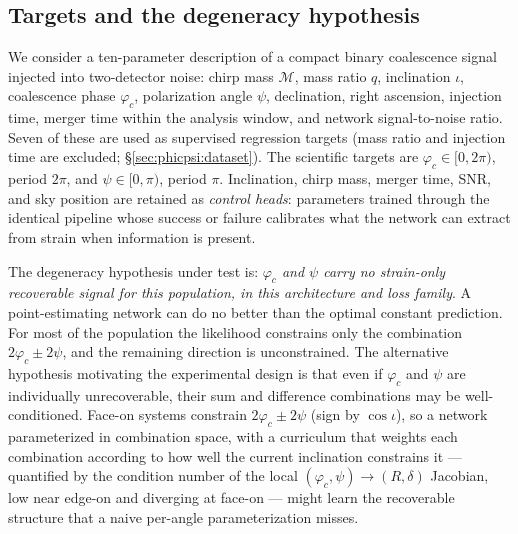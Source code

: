 \subsection{Targets and the degeneracy hypothesis}
\label{sec:phicpsi:targets}

We consider a ten-parameter description of a compact binary coalescence signal injected into two-detector noise: chirp mass $\mathcal{M}$, mass ratio $q$, inclination $\iota$, coalescence phase $\varphi_c$, polarization angle $\psi$, declination, right ascension, injection time, merger time within the analysis window, and network signal-to-noise ratio.
Seven of these are used as supervised regression targets (mass ratio and injection time are excluded; \S\ref{sec:phicpsi:dataset}).
The scientific targets are $\varphi_c \in [0, 2\pi)$, period $2\pi$, and $\psi \in [0, \pi)$, period $\pi$.
Inclination, chirp mass, merger time, SNR, and sky position are retained as \emph{control heads}: parameters trained through the identical pipeline whose success or failure calibrates what the network can extract from strain when information is present.

The degeneracy hypothesis under test is: \emph{$\varphi_c$ and $\psi$ carry no strain-only recoverable signal for this population, in this architecture and loss family}.
A point-estimating network can do no better than the optimal constant prediction.
For most of the population the likelihood constrains only the combination $2\varphi_c \pm 2\psi$, and the remaining direction is unconstrained.
The alternative hypothesis motivating the experimental design is that even if $\varphi_c$ and $\psi$ are individually unrecoverable, their sum and difference combinations may be well-conditioned.
Face-on systems constrain $2\varphi_c \pm 2\psi$ (sign by $\cos\iota$), so a network parameterized in combination space, with a curriculum that weights each combination according to how well the current inclination constrains it --- quantified by the condition number of the local $(\varphi_c,\psi)\to(R,\delta)$ Jacobian, low near edge-on and diverging at face-on --- might learn the recoverable structure that a naive per-angle parameterization misses.


